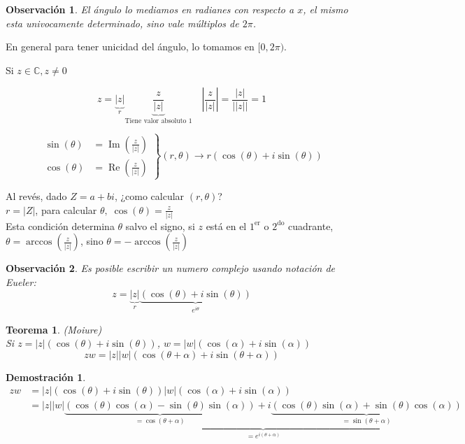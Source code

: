 \documentclass[9pt,a4paper,draft]{article}
\theoremstyle{definition}
\theoremstyle{plain}
\newtheorem{teo}{Teorema}
\newtheorem{demo}{Demostración}[teo]
\newtheorem{obs}{Observación}
\DeclareMathOperator{\re}{Re}
\DeclareMathOperator{\im}{Im}
\begin{document}
\begin{obs}
El ángulo lo mediamos en radianes con respecto a $x$, el mismo esta univocamente determinado, sino vale múltiplos de $2\pi$.
\end{obs}

En general para tener unicidad del ángulo, lo tomamos en $[0, 2\pi)$.

Si $z\in{\mathbb{C}}, z\neq{0}$

$$ z= \underbrace{|z|}_{r} \underbrace{\frac{z}{|z|}}_\text{Tiene valor absoluto 1} \quad \left|\frac{z}{|z|}\right| = \frac{|z|}{||z||} = 1$$

\[
\left.
\begin{align*}
\sin(\theta) &= \im\left(\frac{z}{|z|}\right)\\
\cos(\theta) &= \re\left(\frac{z}{|z|}\right)
\end{align*}
\right\}
(r,\theta) \to r(\cos(\theta) + i\sin(\theta))
\]

Al revés, dado $Z=a+bi$, ¿como calcular $(r,\theta)$? \\
$r=|Z|$, para calcular $\theta,\; \cos(\theta)=\frac{z}{|z|}$ \\
Esta condición determina $\theta$ salvo el signo, si $z$ está en el $1^\text{er}$ o $2^\text{do}$ cuadrante, $\theta=\arccos\left(\frac{z}{|z|}\right)$, sino $\theta=-\arccos\left(\frac{z}{|z|}\right)$

\begin{obs} Es posible escribir un numero complejo usando notación de Eueler:
$$ z=\underbrace{|z|}_{r}\underbrace{(\cos(\theta)+i\sin(\theta))}_{e^{i\theta}}$$
\end{obs}

\begin{teo} (Moiure)\\
Si $z=|z|(\cos(\theta)+i\sin(\theta))$, $w=|w|(\cos(\alpha)+i\sin(\alpha))$
$$ zw = |z||w|(\cos(\theta+\alpha)+i\sin(\theta+\alpha))$$
\end{teo}
\begin{demo}
\begin{align*}
zw &= |z|(\cos(\theta)+i\sin(\theta))|w|(\cos(\alpha)+i\sin(\alpha))\\
   &= |z||w|\underbrace{\underbrace{(\cos(\theta)\cos(\alpha)-\sin(\theta)\sin(\alpha))}_{=\cos(\theta+\alpha)} + i\underbrace{(\cos(\theta)\sin(\alpha)+\sin(\theta)\cos(\alpha))}_{=\sin(\theta+\alpha)}}_{=e^{i(\theta+\alpha)}}
\end{align*}
\end{demo}
\end{document}

